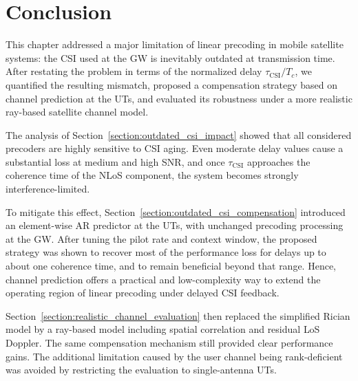 \section{Conclusion}
\label{section:conclusion}

This chapter addressed a major limitation of linear precoding in mobile satellite systems: the \ac{CSI} used at the \ac{GW} is inevitably outdated at transmission time.
After restating the problem in terms of the normalized delay $\tau_{\mathrm{CSI}}/T_c$, we quantified the resulting mismatch, proposed a compensation strategy based on channel prediction at the \acp{UT}, and evaluated its robustness under a more realistic ray-based satellite channel model.

The analysis of Section~\ref{section:outdated_csi_impact} showed that all considered precoders are highly sensitive to \ac{CSI} aging.
Even moderate delay values cause a substantial loss at medium and high \ac{SNR}, and once $\tau_{\mathrm{CSI}}$ approaches the coherence time of the \ac{NLoS} component, the system becomes strongly interference-limited.

To mitigate this effect, Section~\ref{section:outdated_csi_compensation} introduced an element-wise \ac{AR} predictor at the \acp{UT}, with unchanged precoding processing at the \ac{GW}.
After tuning the pilot rate and context window, the proposed strategy was shown to recover most of the performance loss for delays up to about one coherence time, and to remain beneficial beyond that range.
Hence, channel prediction offers a practical and low-complexity way to extend the operating region of linear precoding under delayed \ac{CSI} feedback.

Section~\ref{section:realistic_channel_evaluation} then replaced the simplified Rician model by a ray-based model including spatial correlation and residual \ac{LoS} Doppler.
The same compensation mechanism still provided clear performance gains.
The additional limitation caused by the user channel being rank-deficient was avoided by restricting the evaluation to single-antenna \acp{UT}.
\bigskip

